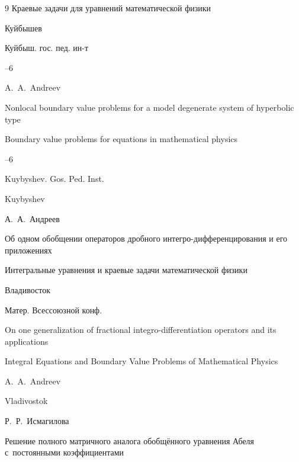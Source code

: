 \begin{thebibliography}{9}
\inbook Краевые задачи для уравнений математической физики

\publaddr Куйбышев

\publ Куйбыш. гос. пед. ин-т


--6


\misctransl

\by A.~A.~Andreev 

\paper Nonlocal boundary value problems for a model degenerate system of hyperbolic type

\inbook Boundary value problems for equations in mathematical physics 

–6

\publ Kuybyshev. Gos. Ped. Inst.

\publaddr Kuybyshev











\by А.~А.~Андреев

\paper Об одном обобщении операторов дробного интегро-дифференцирования и его приложениях

\inbook Интегральные уравнения и краевые задачи математической физики

\publaddr Владивосток

\bookinfo Матер. Всессоюзной конф.



\misctransl

\paper On one generalization of fractional integro-differentiation operators  and its applications

\inbook Integral Equations and Boundary Value Problems of Mathematical Physics

\by A.~A.~Andreev 

\publaddr Vladivostok








\by Р.~Р.~Исмагилова

\paper Решение полного матричного аналога обобщённого уравнения Абеля с~постоянными коэффициентами


\end{thebibliography}
